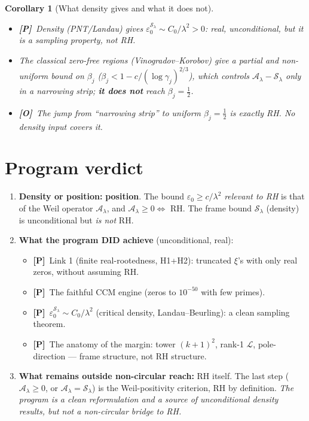 \documentclass[11pt]{article}
\newcommand{\PR}{\textcolor{green!55!black}{\textbf{[P]}}}
\newcommand{\OP}{\textcolor{red!75!black}{\textbf{[O]}}}
\theoremstyle{plain}
\newtheorem{corollary}{Corollary}
\theoremstyle{definition}
\newcommand{\half}{\tfrac12}
\newcommand{\Sframe}{\mathcal S_\lambda}
\newcommand{\Aweil}{\mathcal A_\lambda}
\begin{document}
\begin{corollary}[What density gives and what it does not]
\begin{itemize}[leftmargin=1.4em]
\item \PR\ Density (PNT/Landau) gives $\varepsilon_0^{\Sframe}\sim C_0/\lambda^2>0$:
real, unconditional, but it is a \emph{sampling} property, not RH.
\item The classical zero-free regions (Vinogradov--Korobov) give a \emph{partial}
and \emph{non-uniform} bound on $\beta_j$ ($\beta_j<1-c/(\log\gamma_j)^{2/3}$),
which controls $\Aweil-\Sframe$ \emph{only} in a narrowing strip; \textbf{it does not}
reach $\beta_j=\half$.
\item \OP\ The jump from ``narrowing strip'' to uniform $\beta_j=\half$ is exactly
RH. No density input covers it.
\end{itemize}
\end{corollary}

\section{Program verdict}\label{sec:verdict}

\begin{enumerate}[leftmargin=1.6em]
\item \textbf{Density or position:} \textbf{position}. The bound
$\varepsilon_0\ge c/\lambda^2$ \emph{relevant to RH} is that of the Weil operator
$\Aweil$, and $\Aweil\ge0\Leftrightarrow$ RH. The frame bound $\Sframe$ (density) is
unconditional but \emph{is not} RH.
\item \textbf{What the program DID achieve} (unconditional, real):
\begin{itemize}[leftmargin=1.3em]
\item \PR\ Link 1 (finite real-rootedness, H1+H2): truncated $\xi$'s with only
real zeros, without assuming RH.
\item \PR\ The faithful CCM engine (zeros to $10^{-50}$ with few primes).
\item \PR\ $\varepsilon_0^{\Sframe}\sim C_0/\lambda^2$ (critical density,
Landau--Beurling): a clean sampling theorem.
\item \PR\ The anatomy of the margin: tower $(k+1)^2$, rank-1 $\mathcal L$,
pole-direction --- frame structure, not RH structure.
\end{itemize}
\item \textbf{What remains outside non-circular reach:} RH itself. The last step
($\Aweil\ge0$, or $\Aweil=\Sframe$) is the Weil-positivity criterion, RH by
definition. \emph{The program is a clean reformulation and a source of
unconditional density results, but not a non-circular bridge to RH.}
\end{enumerate}
\end{document}
